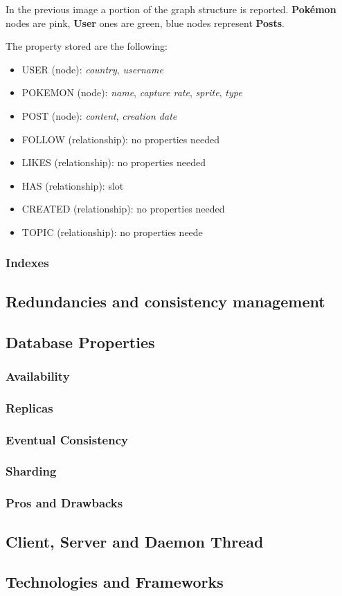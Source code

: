 In the previous image a portion of the graph structure is reported. 
\textbf{Pokémon} nodes are pink, \textbf{User} ones are green, blue nodes represent \textbf{Posts}.

The property stored are the following:
\begin{itemize}
	\item USER (node): \textit{country}, \textit{username}
	\item POKEMON (node): \textit{name}, \textit{capture rate},  \textit{sprite}, \textit{type}
	\item POST (node): \textit{content}, \textit{creation date}
	\item FOLLOW (relationship): no properties needed
	\item LIKES (relationship): no properties needed
	\item HAS (relationship): slot
	\item CREATED (relationship): no properties needed
	\item TOPIC (relationship): no properties neede
\end{itemize}


\subsubsection{Indexes}


\subsection{Redundancies and consistency management}

\subsection{Database Properties}

\subsubsection{Availability}
\subsubsection{Replicas}
\subsubsection{Eventual Consistency}
\subsubsection{Sharding}
\subsubsection{Pros and Drawbacks}


\subsection{Client, Server and Daemon Thread}

\subsection{Technologies and Frameworks}

